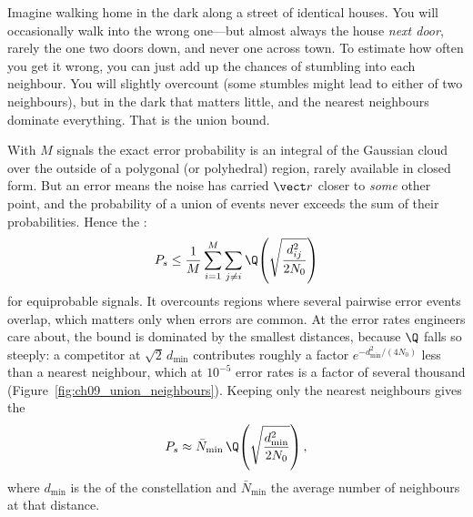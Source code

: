 \begin{analogy}
Imagine walking home in the dark along a street of identical houses. You will occasionally walk
into the wrong one---but almost always the house \emph{next door}, rarely the one two doors down,
and never one across town. To estimate how often you get it wrong, you can just add up the
chances of stumbling into each neighbour. You will slightly overcount (some stumbles might lead to
either of two neighbours), but in the dark that matters little, and the nearest neighbours
dominate everything. That is the union bound.
\end{analogy}

With $M$ signals the exact error probability is an integral of the Gaussian cloud over the
outside of a polygonal (or polyhedral) region, rarely available in closed form. But an error
means the noise has carried $\vect r$ closer to \emph{some} other point, and the probability of a
union of events never exceeds the sum of their probabilities. Hence the :
\begin{equation}
P_s\le\frac1M\sum_{i=1}^M\sum_{j\ne i}\Q\!\left(\sqrt{\frac{d_{ij}^2}{2N_0}}\right)
\label{eq:ch09:union}
\end{equation}
for equiprobable signals. It overcounts regions where several pairwise error events overlap,
which matters only when errors are common. At the error rates engineers care about, the bound is
dominated by the smallest distances, because $\Q$ falls so steeply: a competitor at
$\sqrt2\,d_{\min}$ contributes roughly a factor $e^{-d_{\min}^2/(4N_0)}$ less than a nearest
neighbour, which at $10^{-5}$ error rates is a factor of several thousand
(Figure~\ref{fig:ch09_union_neighbours}). Keeping only the nearest neighbours gives the
\begin{equation}
P_s\approx\bar N_{\min}\,\Q\!\left(\sqrt{\frac{d_{\min}^2}{2N_0}}\right),
\label{eq:ch09:nn}
\end{equation}
where $d_{\min}$ is the  of the constellation and $\bar N_{\min}$ the
average number of neighbours at that distance.


